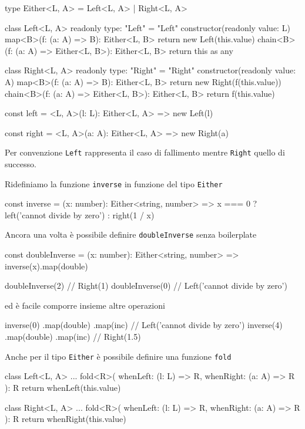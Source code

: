 \documentclass[12pt]{article}
\theoremstyle{definition}
\newenvironment{code}
  {\vspace{0.5cm} \VerbatimEnvironment\begin{typescriptcode}}
  {\end{typescriptcode} \vspace{0.2cm}}
\begin{document}
\begin{code}
type Either<L, A> = Left<L, A> | Right<L, A>

class Left<L, A> {
  readonly type: "Left" = "Left"
  constructor(readonly value: L) {}
  map<B>(f: (a: A) => B): Either<L, B> {
    return new Left(this.value)
  }
  chain<B>(f: (a: A) => Either<L, B>): Either<L, B> {
    return this as any
  }
}

class Right<L, A> {
  readonly type: "Right" = "Right"
  constructor(readonly value: A) {}
  map<B>(f: (a: A) => B): Either<L, B> {
    return new Right(f(this.value))
  }
  chain<B>(f: (a: A) => Either<L, B>): Either<L, B> {
    return f(this.value)
  }
}

const left = <L, A>(l: L): Either<L, A> =>
  new Left(l)

const right = <L, A>(a: A): Either<L, A> =>
  new Right(a)
\end{code}

Per convenzione \texttt{Left} rappresenta il caso di fallimento mentre \texttt{Right} quello di successo.

Ridefiniamo la funzione \texttt{inverse} in funzione del tipo \texttt{Either}

\begin{code}
const inverse = (x: number): Either<string, number> =>
  x === 0 ? left('cannot divide by zero') : right(1 / x)
\end{code}

Ancora una volta è possibile definire \texttt{doubleInverse} senza boilerplate

\begin{code}
const doubleInverse = (x: number): Either<string, number> =>
  inverse(x).map(double)

doubleInverse(2) // Right(1)
doubleInverse(0) // Left('cannot divide by zero')
\end{code}

ed è facile comporre insieme altre operazioni

\begin{code}
inverse(0)
  .map(double)
  .map(inc) // Left('cannot divide by zero')
inverse(4)
  .map(double)
  .map(inc) // Right(1.5)
\end{code}

Anche per il tipo \texttt{Either} è possibile definire una funzione \texttt{fold}

\begin{code}
class Left<L, A> {
  ...
  fold<R>(
    whenLeft: (l: L) => R,
    whenRight: (a: A) => R
  ): R {
    return whenLeft(this.value)
  }
}

class Right<L, A> {
  ...
  fold<R>(
    whenLeft: (l: L) => R,
    whenRight: (a: A) => R
  ): R {
    return whenRight(this.value)
  }
}
\end{code}
\end{document}
